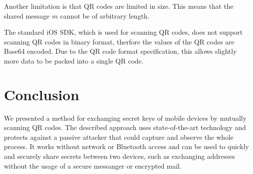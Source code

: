 Another limitation is that QR codes are limited in size.
This means that the shared message $m$ cannot be of arbitrary length.

The standard iOS SDK, which is used for scanning QR codes, does not support scanning QR codes in binary format, therfore the values of the QR codes are Base64 encoded.
Due to the QR code format specification, this allows slightly more data to be packed into a single QR code.


\section{Conclusion}

We presented a method for exchanging secret keys of mobile devices by mutually scanning QR codes.
The described approach uses state-of-the-art technology and protects against a passive attacker that could capture and observe the whole process.
It works without network or Bluetooth access and can be used to quickly and securely share secrets between two devices, such as exchanging addresses without the usage of a secure messanger or encrypted mail.
